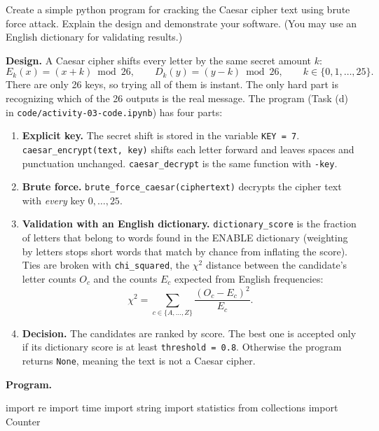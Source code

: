\documentclass[a4paper, 10pt]{article}
\begin{document}
\begin{problem}
\begin{subproblems_alpha}
	\item Create a simple python program for cracking the Caesar cipher text using brute force attack.
	      Explain the design and demonstrate your software.
	      (You may use an English dictionary for validating results.)
	      \myspace[v][3][mm]
	      \begin{solution}
		      \textbf{Design.}
		      A Caesar cipher shifts every letter by the same secret amount $k$:
		      \[ E_k(x) = (x + k) \bmod 26, \qquad D_k(y) = (y - k) \bmod 26, \qquad k \in \{0, 1, \ldots, 25\}. \]
		      There are only 26 keys, so trying all of them is instant.
		      The only hard part is recognizing which of the 26 outputs is the real message.
		      The program (Task (d) in \texttt{code/activity-03-code.ipynb}) has four parts:
		      \begin{enumerate}[label=\arabic*.]
			      \item \textbf{Explicit key.} The secret shift is stored in the variable \texttt{KEY = 7}. \newline
			            \texttt{caesar\_encrypt(text, key)} shifts each letter forward and leaves spaces and punctuation unchanged.
			            \texttt{caesar\_decrypt} is the same function with \texttt{-key}.
			      \item \textbf{Brute force.} \texttt{brute\_force\_caesar(ciphertext)} decrypts the cipher text with \emph{every} key $0, \ldots, 25$.
			      \item \textbf{Validation with an English dictionary.} \texttt{dictionary\_score} is the fraction of letters that belong to words found in the ENABLE dictionary
			            (weighting by letters stops short words that match by chance from inflating the score).
			            Ties are broken with \texttt{chi\_squared}, the $\chi^2$ distance between the candidate's letter counts $O_c$ and the counts $E_c$ expected from English frequencies:
			            \[ \chi^2 = \sum_{c \in \{A, \ldots, Z\}} \frac{(O_c - E_c)^2}{E_c}. \]
			      \item \textbf{Decision.} The candidates are ranked by score.
			            The best one is accepted only if its dictionary score is at least \texttt{threshold = 0.8}.
			            Otherwise the program returns \texttt{None}, meaning the text is not a Caesar cipher.
		      \end{enumerate}

		      \textbf{Program.}
		      \begin{codingbox*}[language=Python, belowskip=6pt]
import re
import time
import string
import statistics
from collections import Counter


\end{codingbox*}
\end{solution}
\end{subproblems_alpha}
\end{problem}
\end{document}
